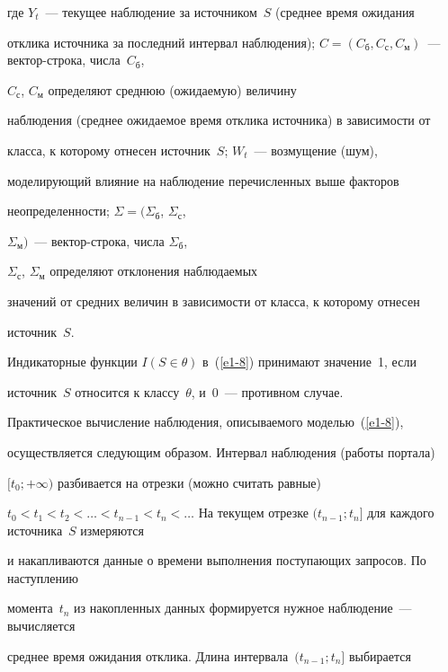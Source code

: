 где $Y_t$~--- текущее наблюдение за источником~$S$ (среднее время ожидания 


отклика источника за последний интервал наблюдения); $C=(C_{\mathrm{б}}, 


C_{\mathrm{с}}, C_{\mathrm{м}})$~--- век\-тор-стро\-ка, числа~$C_{\mathrm{б}}$, 


$C_{\mathrm{с}}$, $C_{\mathrm{м}}$ определяют среднюю (ожидаемую) величину 


наблюдения (среднее ожидаемое время отклика источника) в за\-ви\-си\-мости от 


клас\-са, к которому отнесен источник~$S$; $W_t$~--- возмущение (шум), 


моделирующий влияние на наблюдение перечисленных выше факторов 


неопределенности; $\Sigma =(\Sigma_{\mathrm{б}}$, $\Sigma_{\mathrm{с}}$, 


$\Sigma_{\mathrm{м}})$~--- вектор-строка, числа $\Sigma_{\mathrm{б}}$, 


$\Sigma_{\mathrm{с}}$, $\Sigma_{\mathrm{м}}$ определяют отклонения наблюдаемых 


значений от средних величин в зависимости от класса, к которому отнесен 


источник~$S$. 


      


      Индикаторные функции $I(S\in \theta)$ в~(\ref{e1-8}) принимают значение~1, если 


источник~$S$ относится к классу~$\theta$, и~0~--- противном случае.


      


      Практическое вычисление наблюдения, описываемого моделью~(\ref{e1-8}), 


осуществляется следующим образом. Интервал наблюдения (работы портала) 


$[t_0;+\infty)$ разбивается на отрезки (можно считать равные) 


$t_0<t_1<t_2<\ldots <t_{n-1}<t_n<\ldots$ На текущем отрезке $(t_{n-1};t_n]$ для каждого источника~$S$ измеряются 


и накапливаются данные о времени выполнения поступающих запросов. По наступлению 


момента~$t_n$ из накопленных данных формируется нужное наблюдение~--- вычисляется 


среднее время ожидания отклика. Длина интервала~$(t_{n-1};t_n]$ выбирается 


